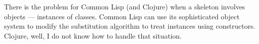 \begin{remark}
There is the problem for Common Lisp (and Clojure) when a skeleton
involves objects --- instances of classes. Common Lisp can use its
sophisticated object system to modify the substitution algorithm to
treat instances using constructors. Clojure, well, I do not know how to
handle that situation.
\end{remark}
